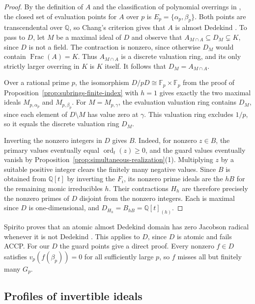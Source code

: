 \documentclass{article}
\DeclareMathOperator{\ord}{ord}
\theoremstyle{remark}
\begin{document}
\begin{proof}
    By the definition of $A$ and the classification of polynomial overrings in \cite[Theorem~6.2]{CPOverrings}, the closed set of evaluation points for $A$ over $p$ is $E_p = \{\alpha_p, \beta_p\}$.
    Both points are transcendental over $\mathbb{Q}$, so Chang's criterion gives that $A$ is almost Dedekind \cite[Corollary~4.5]{Chang}.
    To pass to $D$, let $M$ be a maximal ideal of $D$ and observe that $A_{M \cap A} \subseteq D_M \subsetneq K$, since $D$ is not a field.
    The contraction is nonzero, since otherwise $D_M$ would contain $\operatorname{Frac}(A) = K$.
    Thus $A_{M \cap A}$ is a discrete valuation ring, and its only strictly larger overring in $K$ is $K$ itself.
    It follows that $D_M = A_{M \cap A}$.

    Over a rational prime $p$, the isomorphism $D/pD \cong \mathbb{F}_p \times \mathbb{F}_p$ from the proof of Proposition~\ref{prop:subrings-finite-index} with $h = 1$ gives exactly the two maximal ideals $M_{p, \alpha_p}$ and $M_{p, \beta_p}$.
    For $M = M_{p, \gamma}$, the evaluation valuation ring contains $D_M$, since each element of $D \setminus M$ has value zero at $\gamma$.
    This valuation ring excludes $1/p$, so it equals the discrete valuation ring $D_M$.

    Inverting the nonzero integers in $D$ gives $B$.
    Indeed, for nonzero $z \in B$, the primary values eventually equal $\ord_t(z) \ge 0$, and the guard values eventually vanish by Proposition~\ref{prop:simultaneous-realization}(1).
    Multiplying $z$ by a suitable positive integer clears the finitely many negative values.
    Since $B$ is obtained from $\mathbb{Q}[t]$ by inverting the $F_i$, its nonzero prime ideals are the $hB$ for the remaining monic irreducibles $h$.
    Their contractions $H_h$ are therefore precisely the nonzero primes of $D$ disjoint from the nonzero integers.
    Each is maximal since $D$ is one-dimensional, and $D_{H_h} = B_{hB} = \mathbb{Q}[t]_{(h)}$.
\end{proof}

Spirito proves that an atomic almost Dedekind domain has zero Jacobson radical whenever it is not Dedekind \cite[Corollary~4.10]{SpiritoBoundness}.
This applies to $D$, since $D$ is atomic and fails ACCP.
For our $D$ the guard points give a direct proof.
Every nonzero $f \in D$ satisfies $v_p(f(\beta_p)) = 0$ for all sufficiently large $p$, so $f$ misses all but finitely many $G_p$.

\subsection{Profiles of invertible ideals}
\end{document}
